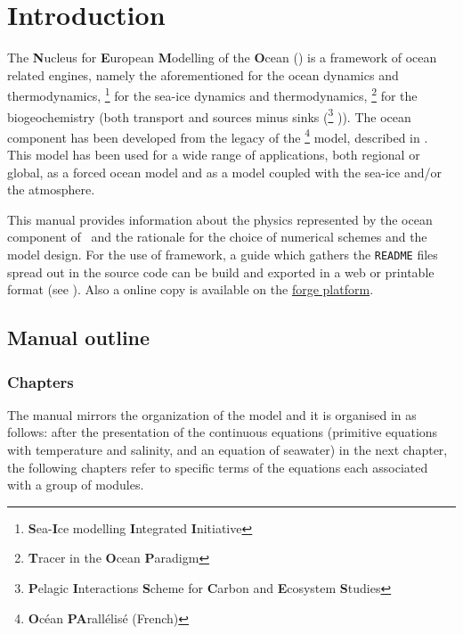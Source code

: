 \chapter*{Introduction}

The \textbf{N}ucleus for \textbf{E}uropean \textbf{M}odelling of the \textbf{O}cean (\NEMO) is
a framework of ocean related engines, namely the aforementioned for
the ocean dynamics and thermodynamics,
\SIcube \footnote{\textbf{S}ea-\textbf{I}ce modelling \textbf{I}ntegrated \textbf{I}nitiative}
for the sea-ice dynamics and thermodynamics,
\TOP \footnote{\textbf{T}racer in the \textbf{O}cean \textbf{P}aradigm} for
the biogeochemistry (both transport and sources minus sinks
(\PISCES \footnote{
  \textbf{P}elagic \textbf{I}nteractions \textbf{S}cheme for
  \textbf{C}arbon and \textbf{E}cosystem \textbf{S}tudies
}
)).
The ocean component has been developed from the legacy of
the \OPA \footnote{\textbf{O}c\'{e}an \textbf{PA}rall\'{e}lis\'{e} (French)}
model, described in \citet{madec.delecluse.ea_NPM98}.
This model has been used for a wide range of applications, both regional or global,
as a forced ocean model and as a model coupled with the sea-ice and/or the atmosphere.

This manual provides information about the physics represented by the ocean component of \NEMO\ and
the rationale for the choice of numerical schemes and the model design.
For the use of framework,
a guide which gathers the \texttt{README} files spread out in the source code can be build and
exported in a web or printable format (see ).
Also a online copy is available on the \href{http://forge.ipsl.jussieu.fr/nemo}{forge platform}.

\section*{Manual outline}

\subsection*{Chapters}

The manual mirrors the organization of the model and it is organised in as follows:
after the presentation of the continuous equations
(primitive equations with temperature and salinity, and an equation of seawater) in the next chapter,
the following chapters refer to specific terms of the equations each associated with
a group of modules.

